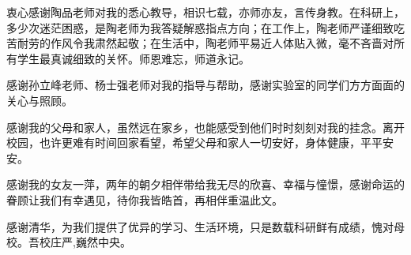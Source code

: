 \begin{ack}

衷心感谢陶品老师对我的悉心教导，相识七载，亦师亦友，言传身教。在科研上，多少次迷茫困惑，是陶老师为我答疑解惑指点方向；在工作上，陶老师严谨细致吃苦耐劳的作风令我肃然起敬；在生活中，陶老师平易近人体贴入微，毫不吝啬对所有学生最真诚细致的关怀。师恩难忘，师道永记。

感谢孙立峰老师、杨士强老师对我的指导与帮助，感谢实验室的同学们方方面面的关心与照顾。

感谢我的父母和家人，虽然远在家乡，也能感受到他们时时刻刻对我的挂念。离开校园，也许更难有时间回家看望，希望父母和家人一切安好，身体健康，平平安安。

感谢我的女友一萍，两年的朝夕相伴带给我无尽的欣喜、幸福与憧憬，感谢命运的眷顾让我们有幸遇见，待你我皆皓首，再相伴重温此文。

感谢清华，为我们提供了优异的学习、生活环境，只是数载科研鲜有成绩，愧对母校。吾校庄严,巍然中央。

\end{ack}
